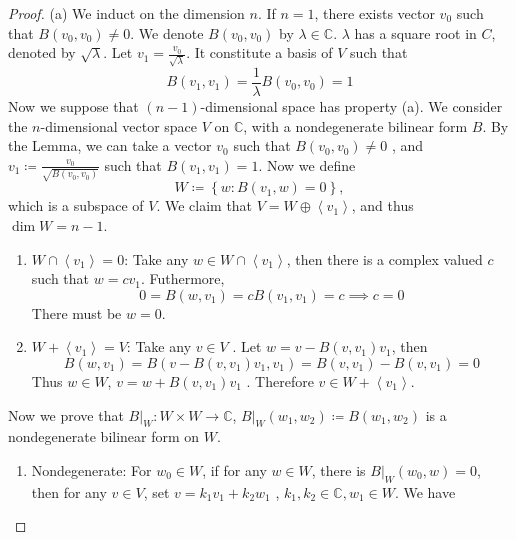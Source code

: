 \documentclass[../main.tex]{subfiles}
\begin{document}
\begin{proof}
    \item (a) We induct on the dimension \(  n  \). If \(  n = 1  \),    there exists vector \(  v_0  \) such that \(  B\left( v_0,v_0 \right)\neq 0   \). We denote \(  B\left( v_0,v_0 \right)   \) by \(   \lambda  \in \mathbb{C}   \). \(   \lambda   \) has a square root in \(  C  \), denoted by \(  \sqrt{ \lambda }  \). Let \(  v_1= \frac{v_0 }{\sqrt{ \lambda } }   \). It constitute a basis of \(  V  \) such that  \[
    B\left( v_1,v_1 \right)= \frac{1 }{ \lambda  }B\left( v_0,v_0 \right)= 1   
    \]       Now we suppose that \(  \left( n-1 \right)   \)-dimensional space has property (a). We consider the \(  n  \)-dimensional vector space \(  V  \) on \(  \mathbb{C}   \), with a nondegenerate bilinear form \(  B  \).  By the Lemma, we can take a vector \(  v_0  \) such that \(  B\left( v_0,v_0 \right)\neq 0\) , and \(  v_1\coloneqq \frac{v_0 }{\sqrt{B\left( v_0,v_0 \right) } }   \) such that \(  B\left( v_1,v_1 \right)= 1   \).    Now we define \[
    W\coloneqq \left\{ w: B\left( v_1,w \right)= 0  \right\},
    \] which is a subspace of \(  V  \). We claim that \(  V= W\oplus \left<v_1 \right>  \), and thus \(  \operatorname{dim}W= n-1  \). 
    \begin{enumerate}
     \item \(  W\cap \left<v_1 \right>= 0  \):  Take any \(  w \in W\cap \left<v_1 \right>  \), then there is a complex valued \(  c  \) such that \(  w= cv_1  \). Futhermore,  \[
     0= B\left( w,v_1 \right)= cB\left( v_1,v_1 \right) = c\implies  c= 0 
     \]  There must be \(  w= 0  \).
     \item \(  W+ \left<v_1 \right>= V  \): Take any \(  v \in V  \) . Let \(  w=  v- B\left( v,v_1 \right)v_1   \), then \[
     B\left( w,v_1 \right)= B\left( v-B\left( v,v_1 \right)v_1,v_1  \right)=   B\left( v,v_1 \right)-B\left( v,v_1 \right)= 0  
     \]    Thus \(  w \in W  \), \(  v= w+ B\left( v,v_1 \right)v_1   \)   . Therefore \(  v \in W+ \left<v_1 \right>  \). 
    \end{enumerate}
    Now we prove that \(  B|_{W}: W\times W\to \mathbb{C}   \), \(  B|_{W}\left( w_1,w_2 \right)\coloneqq B\left( w_1,w_2 \right)    \) is a nondegenerate bilinear form on \(  W  \).
    \begin{enumerate}
     \item  Nondegenerate: For \(  w_0 \in W  \), if for any \(  w \in W  \), there is  \(  B|_{W}\left( w_0,w \right)= 0   \), then for any \(  v \in V  \), set \(  v=  k_1v_1+ k_2w_1  \) , \(  k_1,k_2\in \mathbb{C} , w_1\in W  \).  We have \[
\]
\end{enumerate}
\end{proof}
\end{document}
